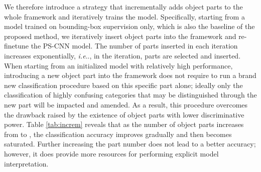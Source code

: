 \documentclass[10pt,twocolumn,letterpaper]{article}
\makeatletter
\DeclareRobustCommand\onedot{\futurelet\@let@token\@onedot}
\def\@onedot{\ifx\@let@token.\else.\null\fi\xspace}
\def\ie{\emph{i.e}\onedot} \def\Ie{\emph{I.e}\onedot}
\makeatother
\begin{document}
We therefore introduce a strategy that incrementally adds object parts to the whole framework and iteratively trains the model. Specifically, starting from a model trained on bounding-box supervision only, which is also the baseline of the proposed method, we iteratively insert object parts into the framework and re-finetune the PS-CNN model. The number of parts inserted in each iteration increases exponentially, \ie, in the  iteration,  parts are selected and inserted. When starting from an initialized model with relatively high performance, introducing a new object part into the framework does not require to run a brand new classification procedure based on this specific part alone; ideally only the classification of highly confusing categories that may be distinguished through the new part will be impacted and amended. As a result, this procedure overcomes the drawback raised by the existence of object parts with lower discriminative power. Table \ref{tab:increm} reveals that as the number of object parts increases from  to , the classification accuracy improves gradually and then becomes saturated. Further increasing the part number does not lead to a better accuracy; however, it does provide more resources for performing explicit model interpretation.
\end{document}
